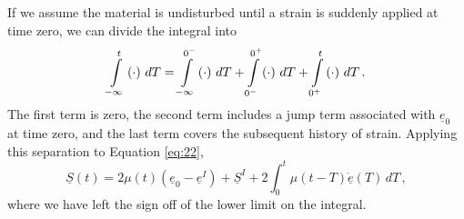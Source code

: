 If we assume the material is undisturbed until a strain is suddenly
applied at time zero, we can divide the integral into
\begin{equation}
\intop_{-\infty}^{t}\left(\cdot\right)\, dT=\intop_{-\infty}^{0^{-}}\left(\cdot\right)\, dT+\intop_{0^{-}}^{0^{+}}\left(\cdot\right)\, dT+\intop_{0^{+}}^{t}\left(\cdot\right)\, dT\,.\label{eq:27}
\end{equation}
The first term is zero, the second term includes a jump term associated
with $\underline{e}_{0}$ at time zero, and the last term covers the
subsequent history of strain. Applying this separation to Equation
\vref{eq:22},
\begin{equation}
\underline{S}\left(t\right)=2\mu\left(t\right)\left(\underline{e}_{0}-\underline{e}^{I}\right)+\underline{S}^{I}+2\int_{0}^{t}\mu\left(t-T\right)\underline{\dot{e}}\left(T\right)\, dT\,,\label{eq:28}
\end{equation}
where we have left the sign off of the lower limit on the integral.

